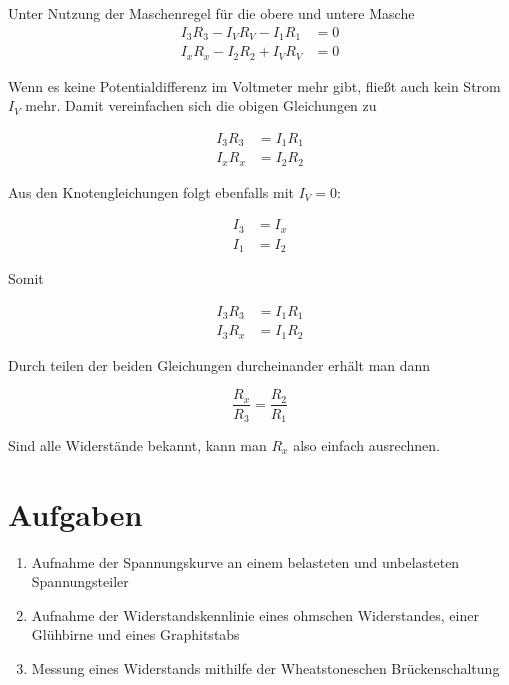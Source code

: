 \documentclass[a4paper,german,12pt,smallheadings]{scrartcl}
\begin{document}
Unter Nutzung der Maschenregel für die obere und untere Masche
\begin{align}
  I_3R_3 - I_V R_V - I_1 R_1 &= 0 \\
  I_xR_x - I_2 R_2 + I_V R_V &= 0
\end{align}

Wenn es keine Potentialdifferenz im Voltmeter mehr gibt, fließt auch kein Strom
$I_V$ mehr. Damit vereinfachen sich die obigen Gleichungen zu

\begin{align}
  I_3 R_3 &= I_1 R_1 \\
  I_x R_x &= I_2 R_2
\end{align}

Aus den Knotengleichungen folgt ebenfalls mit $I_V = 0$:

\begin{align}
  I_3 &= I_x \\
  I_1 &= I_2
\end{align}

Somit

\begin{align}
  I_3 R_3 &= I_1 R_1 \\
  I_3 R_x &= I_1 R_2
\end{align}

Durch teilen der beiden Gleichungen durcheinander erhält man dann

\begin{equation}
  \frac{R_x}{R_3} = \frac{R_2}{R_1}
\end{equation}

Sind alle Widerstände bekannt, kann man $R_x$ also einfach ausrechnen.

\section{Aufgaben}

\begin{enumerate}
  \item Aufnahme der Spannungskurve an einem belasteten und unbelasteten Spannungsteiler
  \item Aufnahme der Widerstandskennlinie eines ohmschen Widerstandes, einer Glühbirne und eines Graphitstabs
  \item Messung eines Widerstands mithilfe der Wheatstoneschen Brückenschaltung
\end{enumerate}
\end{document}
